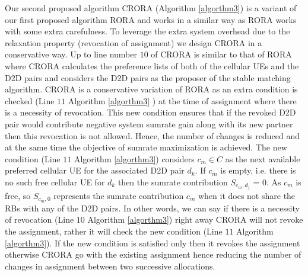 \documentclass[times]{dacauth}
\begin{document}
\noindent
Our second proposed algorithm CRORA (Algorithm \ref{algorthm3}) is a variant of our first proposed algorithm RORA and works in a similar way as RORA works with some extra carefulness. To leverage the extra system overhead due to the relaxation property (revocation of assignment) we design CRORA in a conservative way. Up to line number $10$ of CRORA is similar to that of  RORA where CRORA calculates the preference lists of both of the cellular UEs and the D2D pairs and considers the D2D pairs as the proposer of the stable matching algorithm. CRORA is a conservative variation of RORA as an extra condition is checked (Line $11$   Algorithm \ref{algorthm3} ) at the time of assignment where there is a necessity of revocation. This new condition ensures that if the revoked D2D pair would contribute negative system sumrate gain along with its new partner then this revocation is not allowed. Hence, the number of changes is reduced and at the same time the objective of sumrate maximization is achieved. The new condition (Line $11$  Algorithm \ref{algorthm3}) considers $c_m \in C$ as the next available preferred cellular UE for the associated D2D pair $d_k$. If $c_m$ is empty, i.e. there is no such free cellular UE for $d_k$ then the sumrate contribution $S_{c_m, d_j}$ = 0. As $c_m$ is free, so  $S_{c_m,0}$ represents the sumrate contribution $c_m$ when it does not share the RBs with any of the D2D pairs. In other words, we can say if there is a necessity of revocation (Line $10$ Algorithm \ref{algorthm3}) right away CRORA will not revoke the assignment, rather it will check the new condition (Line $11$ Algorithm \ref{algorthm3}). If the new condition is satisfied only then it revokes the assignment otherwise CRORA go with the existing assignment hence reducing the number of changes in assignment between two successive allocations. 
 
\end{document}
